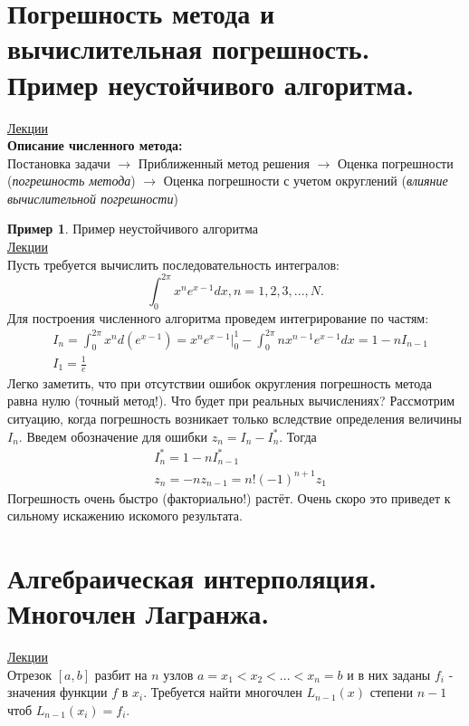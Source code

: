 \documentclass[specialist, subf, href, colorlinks=true, 12pt, times, mtpro, final]{disser}
\theoremstyle{definition}
\newtheorem{example}{Пример}[section]
\begin{document}
\tableofcontents

\section {Погрешность метода и вычислительная погрешность. Пример неустойчивого алгоритма.}
    \hyperlink {lects.1}{Лекции} \\
    \textbf{Описание численного метода:}\\
    Постановка задачи $\rightarrow$ Приближенный метод решения $\rightarrow$ Оценка погрешности (\textit{погрешность метода}) $\rightarrow$ Оценка погрешности с учетом округлений (\textit{влияние вычислительной погрешности})  

	\begin{example}
    	Пример неустойчивого алгоритма \\
    	\hyperlink {lects.14}{Лекции}\\
    	Пусть требуется вычислить последовательность интегралов:
    	$$
    	    \int_0^{2\pi}{x^n e^{x-1}dx}, n = 1,2,3,...,N.
    	$$
    	Для построения численного алгоритма проведем интегрирование по частям:
    	$$
    	\begin{aligned}
    	    & I_n = \int_0^{2\pi}{x^n d(e^{x-1})} = x^n e^{x-1} \big|_0^1 - \int_0^{2\pi}{n x^{n-1} e^{x-1}dx} = 1 - n 	I_{n-1} \\
        	& I_1 = \frac{1}{e}
    	\end{aligned}
    	$$
    	Легко заметить, что при отсутствии ошибок округления погрешность метода равна нулю (точный метод!). Что будет при реальных вычислениях? Рассмотрим ситуацию, когда погрешность возникает только вследствие определения величины $I_n$. Введем обозначение для ошибки $z_n = I_n - I_n^*$. Тогда
    	$$
    	\begin{aligned}
    	    & I_n^* = 1 - n I_{n-1}^* \\
        	& z_n = - n z_{n-1} = n! (-1)^{n+1} z_1
    	\end{aligned}
    	$$
    	Погрешность очень быстро (факториально!) растёт. Очень скоро это приведет к сильному искажению искомого результата.
	\end{example}

\section {Алгебраическая интерполяция. Многочлен Лагранжа.}
	\hyperlink {lects.15}{Лекции}\\
	Отрезок $[a,b]$ разбит на $n$ узлов $a = x_1 < x_2 < ... < x_n = b$ и в них заданы $f_i$ - значения функции $f$ в $x_i$. Требуется найти многочлен $L_{n-1}(x)$ степени $n - 1$ чтоб $L_{n - 1}(x_i) = f_i$.
\end{document}
